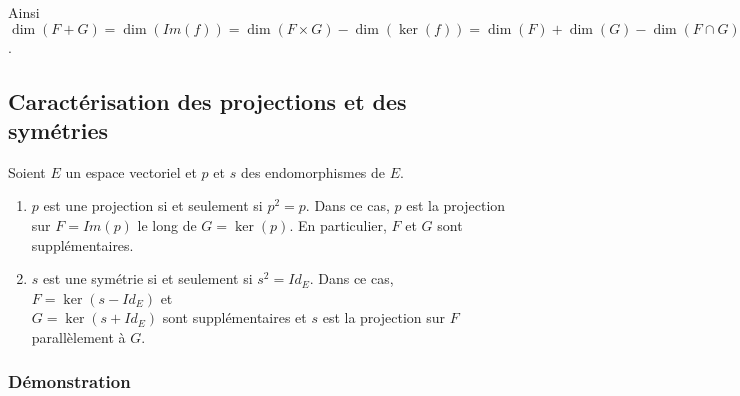 \documentclass[a4paper,10pt]{book} %
\begin{document}
Ainsi $\dim(F+G)=\dim(Im(f))=\dim(F\times G)-\dim(\ker(f))=\dim(F)+\dim(G)-\dim(F\cap G)$.

\newpage

\subsection{Caractérisation des projections et des symétries}
Soient $E$ un espace vectoriel et $p$ et $s$ des endomorphismes de $E$.

\begin{enumerate}
\item $p$ est une projection si et seulement si $p^2=p$. Dans ce cas, $p$ est la projection sur $F=Im(p)$ le long de $G=\ker(p)$. En particulier, $F$ et $G$ sont supplémentaires.
\item $s$ est une symétrie si et seulement si $s^2=Id_E$. Dans ce cas, $F=\ker(s-Id_E)$ et \\
$G=\ker(s+Id_E)$ sont supplémentaires et $s$ est la projection sur $F$ parallèlement à $G$.
\end{enumerate}

\subsubsection{Démonstration}
\end{document}
